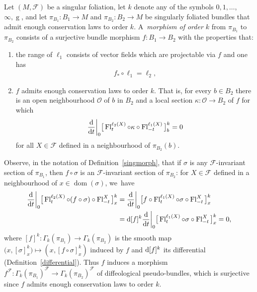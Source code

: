 \documentclass[pdftex]{sigma}
\numberwithin{equation}{section}
\def\g{\operatorname{g}}
\def\dom{\operatorname{dom}}
\def\Fl{\operatorname{Fl}}
\def\FF{{\mathcal{F}}}
\def\OO{{\mathcal{O}}}
\begin{document}
\begin{Definition}\label{singmorph}
Let $(M,\FF)$ be a singular foliation, let $k$ denote any of the symbols $0,1,\dots$, $\infty,\g$, and let $\pi_{B_{1}}\colon B_{1}\rightarrow M$ and $\pi_{B_{2}}\colon B_{2}\rightarrow M$ be singularly foliated bundles that admit enough conservation laws to order $k$. A~\textit{morphism of order $k$} from $\pi_{B_{1}}$ to $\pi_{B_{2}}$ consists of a surjective bundle morphism $f\colon B_{1}\rightarrow B_{2}$ with the properties that:
\begin{enumerate}\itemsep=0pt
\item[$(1)$] the range of $\ell_{1}$ consists of vector fields which are projectable via $f$ and one has
\begin{gather*}
f_{*}\circ\ell_{1} = \ell_{2},
\end{gather*}
\item[$(2)$] $f$ admits enough conservation laws to order $k$. That is, for every $b\in B_{2}$ there is an open neighbourhood $\OO$ of $b$ in $B_{2}$ and a local section $\kappa\colon \OO\rightarrow B_{2}$ of $f$ for which
\begin{gather*}
\frac{\rm d}{{\rm d}t}\bigg|_{0}\big[\Fl^{\ell_{2}(X)}_{t}\circ\kappa\circ\Fl^{\ell_{1}(X)}_{-t}\big]^{k}_{b} = 0
\end{gather*}
for all $X\in\FF$ defined in a neighbourhood of $\pi_{B_{2}}(b)$.
\end{enumerate}
\end{Definition}

Observe, in the notation of Definition~\ref{singmorph}, that if $\sigma$ is any $\FF$-invariant section of $\pi_{B_{1}}$, then $f\circ\sigma$ is an $\FF$-invariant section of $\pi_{B_{2}}$: for $X\in\FF$ defined in a neighbourhood of $x\in\dom(\sigma)$, we~have
\begin{align*}
\frac{\rm d}{{\rm d}t}\bigg|_{0}\big[\Fl^{\ell_{2}(X)}_{t}\circ (f\circ\sigma)\circ\Fl^{X}_{-t}\big]^{k}_{x} &
= \frac{\rm d}{{\rm d}t}\bigg|_{0}\big[f\circ\Fl^{\ell_{1}(X)}_{t}\circ\sigma\circ\Fl^{X}_{-t}\big]^{k}_{x}
\\
&= {\rm d}[f]^{k}\frac{\rm d}{{\rm d}t}\bigg|_{0}\big[\Fl^{\ell_{1}(X)}_{t}\circ\sigma\circ\Fl^{X}_{-t}\big]^{k}_{x}=0,
\end{align*}
where $[f]^{k}\colon \Gamma_{k}(\pi_{B_{1}})\rightarrow\Gamma_{k}(\pi_{B_{2}})$ is the smooth map $\big(x,[\sigma]^{k}_{x}\big)\mapsto (x,[f\circ\sigma]^{k}_{x})$ induced by $f$ and ${\rm d}[f]^{k}$ its differential (Definition~\ref{differential}). Thus $f$ induces a morphism $f^{\FF}\colon \Gamma_{k}(\pi_{B_{1}})^{\FF}\rightarrow\Gamma_{k}(\pi_{B_{2}})^{\FF}$ of diffeological pseudo-bundles, which is surjective since $f$ admits enough conservation laws to order $k$.
\end{document}
